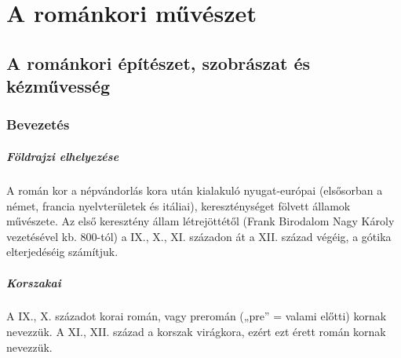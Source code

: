 \chapter{A románkori művészet} %
\label{ch:5_romankor}

\section{A románkori építészet, szobrászat és kézművesség}



	\subsection*{Bevezetés}
	
		\paragraph{Földrajzi elhelyezése}
		A román kor a népvándorlás kora után kialakuló nyugat-európai (elsősorban a német, francia nyelvterületek és itáliai), kereszténységet fölvett államok művészete.
		Az első keresztény állam létrejöttétől (Frank Birodalom Nagy Károly vezetésével kb. 800-tól) a IX., X., XI. századon át a XII. század végéig, a gótika elterjedéséig számítjuk.
		
		\paragraph{Korszakai}
		A IX., X. századot korai román, vagy preromán („pre” = valami előtti) kornak nevezzük.
		A XI., XII. század a korszak virágkora, ezért ezt érett román kornak nevezzük.
		
